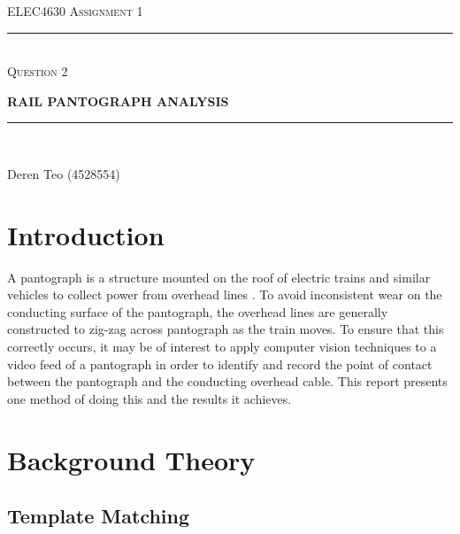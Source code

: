 \begin{titlepage}
  \centering

  \textsc{ELEC4630 Assignment 1}\\
  \vspace{9cm}

  \rule{\linewidth}{0.5pt}\\

  \vspace{1em}
  \LARGE\textsc{Question 2}\\
  \vspace{1em}

  \LARGE\uppercase{\textbf{{Rail Pantograph Analysis}}}\\

  \rule{\linewidth}{2pt}\\

  \vfill

  \normalsize{Deren Teo (4528554)}
  \vspace{1cm}

\end{titlepage}

\section{Introduction}

A pantograph is a structure mounted on the roof of electric trains and similar vehicles to collect power from overhead lines \cite{toyodenki_nd}. To avoid inconsistent wear on the conducting surface of the pantograph, the overhead lines are generally constructed to zig-zag across pantograph as the train moves. To ensure that this correctly occurs, it may be of interest to apply computer vision techniques to a video feed of a pantograph in order to identify and record the point of contact between the pantograph and the conducting overhead cable. This report presents one method of doing this and the results it achieves.

\section{Background Theory}

\subsection{Template Matching}

